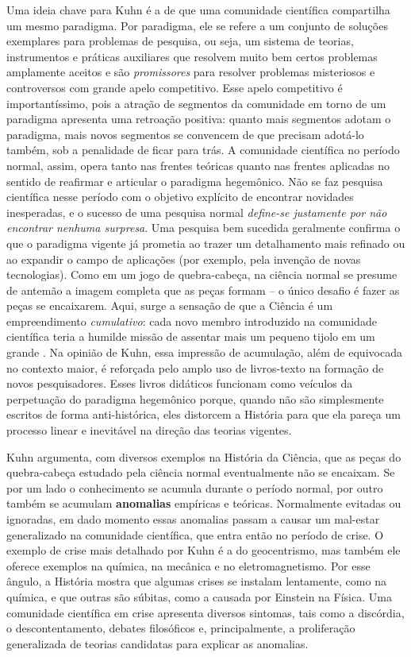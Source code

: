 \documentclass[./main.tex]{subfiles}
\begin{document}
\par Uma ideia chave para Kuhn é a de que uma comunidade científica compartilha um mesmo \gls{paradigma}. Por paradigma, ele se refere a um conjunto de soluções exemplares para problemas de pesquisa, ou seja, um sistema de teorias, instrumentos e práticas auxiliares que resolvem muito bem certos problemas amplamente aceitos e são \textit{promissores} para resolver problemas misteriosos e controversos com grande apelo competitivo. Esse apelo competitivo é importantíssimo, pois a atração de segmentos da comunidade em torno de um paradigma apresenta uma retroação positiva: quanto mais segmentos adotam o paradigma, mais novos segmentos se convencem de que precisam adotá-lo também, sob a penalidade de ficar para trás. A comunidade científica no período normal, assim, opera tanto nas frentes teóricas quanto nas frentes aplicadas no sentido de reafirmar e articular o paradigma hegemônico. Não se faz pesquisa científica nesse período com o objetivo explícito de encontrar novidades inesperadas, e o sucesso de uma pesquisa normal \textit{define-se justamente por não encontrar nenhuma surpresa}. Uma pesquisa bem sucedida geralmente confirma o que o paradigma vigente já prometia ao trazer um detalhamento mais refinado ou ao expandir o campo de aplicações (por exemplo, pela invenção de novas tecnologias). Como em um jogo de quebra-cabeça, na ciência normal se presume de antemão a imagem completa que as peças formam – o único desafio é fazer as peças se encaixarem. Aqui, surge a sensação de que a Ciência é um empreendimento \textit{cumulativo}: cada novo membro introduzido na comunidade científica teria a humilde missão de assentar mais um pequeno tijolo em um grande . Na opinião de Kuhn, essa impressão de acumulação, além de equivocada no contexto maior, é reforçada pelo amplo uso de livros-texto na formação de novos pesquisadores. Esses livros didáticos funcionam como veículos da perpetuação do paradigma hegemônico porque, quando não são simplesmente escritos de forma anti-histórica, eles distorcem a História para que ela pareça um processo linear e inevitável na direção das teorias vigentes.

\par Kuhn argumenta, com diversos exemplos na História da Ciência, que as peças do quebra-cabeça estudado pela ciência normal eventualmente não se encaixam. Se por um lado o conhecimento se acumula durante o período normal, por outro também se acumulam \textbf{anomalias} empíricas e teóricas. Normalmente evitadas ou ignoradas, em dado momento essas anomalias passam a causar um mal-estar generalizado na comunidade científica, que entra então no período de crise. O exemplo de crise mais detalhado por Kuhn é a do geocentrismo, mas também ele oferece exemplos na química, na mecânica e no eletromagnetismo. Por esse ângulo, a História mostra que algumas crises se instalam lentamente, como na química, e que outras são súbitas, como a causada por Einstein na Física. Uma comunidade científica em crise apresenta diversos sintomas, tais como a discórdia, o descontentamento, debates filosóficos e, principalmente, a proliferação generalizada de teorias candidatas para explicar as anomalias.
\end{document}
